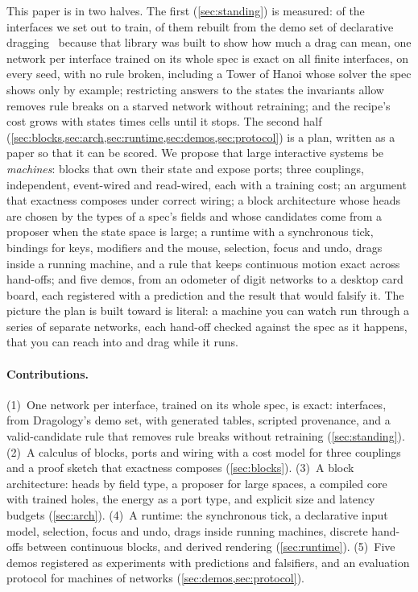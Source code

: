 This paper is in two halves. The first (\cref{sec:standing}) is measured: of the \nPlanned{} interfaces we set out to
train, \nNewDemos{} of them rebuilt from the demo set of declarative dragging~\citep{dragology} because that
library was built to show how much a drag can mean, one network per interface trained on its whole spec is
exact on all \nFiniteSpecs{} finite interfaces, on every seed, with no rule broken, including a Tower of Hanoi whose solver the spec shows only by
example; restricting answers to the states the invariants allow removes rule breaks on a starved network without
retraining; and the recipe's cost grows with states times cells until it stops. The second half
(\cref{sec:blocks,sec:arch,sec:runtime,sec:demos,sec:protocol}) is a plan, written as a paper so that it can be
scored. We propose that large interactive systems be \emph{machines}: blocks that own their state and expose
ports; three couplings, independent, event-wired and read-wired, each with a training cost; an argument that
exactness composes under correct wiring; a block architecture whose heads are chosen by the types of a spec's
fields and whose candidates come from a proposer when the state space is large; a runtime with a synchronous
tick, bindings for keys, modifiers and the mouse, selection, focus and undo, drags inside a running machine, and
a rule that keeps continuous motion exact across hand-offs; and five demos, from an odometer of digit networks
to a desktop card board, each registered with a prediction and the result that would falsify it. The picture
the plan is built toward is literal: a machine you can watch run through a series of separate networks, each
hand-off checked against the spec as it happens, that you can reach into and drag while it runs.

\paragraph{Contributions.}
(1)~One network per interface, trained on its whole spec, is exact: \nPlanned{} interfaces, \nNewDemos{} from
Dragology's demo set, with generated tables, scripted provenance, and a valid-candidate rule that removes rule
breaks without retraining (\cref{sec:standing}).
(2)~A calculus of blocks, ports and wiring with a cost model for three couplings and a proof sketch that
exactness composes (\cref{sec:blocks}).
(3)~A block architecture: heads by field type, a proposer for large spaces, a compiled core with trained holes,
the energy as a port type, and explicit size and latency budgets (\cref{sec:arch}).
(4)~A runtime: the synchronous tick, a declarative input model, selection, focus and undo, drags inside running
machines, discrete hand-offs between continuous blocks, and derived rendering (\cref{sec:runtime}).
(5)~Five demos registered as experiments with predictions and falsifiers, and an evaluation protocol for
machines of networks (\cref{sec:demos,sec:protocol}).
